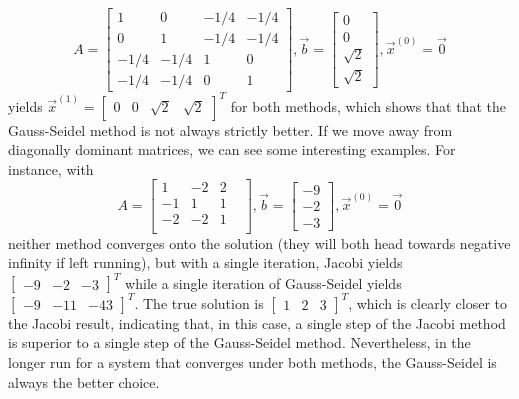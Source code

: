 \documentclass[12pt,letterpaper]{article}
\theoremstyle{definition}
\begin{document}
\begin{equation*}
    A=\begin{bmatrix}
    1&0&-1/4&-1/4\\
    0&1&-1/4&-1/4\\
    -1/4&-1/4&1&0\\
    -1/4&-1/4&0&1
    \end{bmatrix}, \vec{b}=\begin{bmatrix}
    0\\0\\\sqrt{2}\\\sqrt{2}
    \end{bmatrix}, \vec{x}^{(0)}=\vec{0}
\end{equation*}
yields $\vec{x}^{(1)}=\begin{bmatrix}
0&0&\sqrt{2}&\sqrt{2}
\end{bmatrix}^T$ for both methods, which shows that that the Gauss-Seidel method is not always strictly better. If we move away from diagonally dominant matrices, we can see some interesting examples. For instance, with
\begin{equation*}
    A=\begin{bmatrix}
    1&-2&2&\\
    -1&1&1\\
    -2&-2&1\\
    \end{bmatrix}, \vec{b}=\begin{bmatrix}
    -9\\-2\\-3
    \end{bmatrix}, \vec{x}^{(0)}=\vec{0}
\end{equation*}
neither method converges onto the solution (they will both head towards negative infinity if left running), but with a single iteration, Jacobi yields $\begin{bmatrix}
-9&-2&-3
\end{bmatrix}^T$ while a single iteration of Gauss-Seidel yields $\begin{bmatrix}
-9&-11&-43
\end{bmatrix}^T$. The true solution is $\begin{bmatrix}
1&2&3
\end{bmatrix}^T$, which is clearly closer to the Jacobi result, indicating that, in this case, a single step of the Jacobi method is superior to a single step of the Gauss-Seidel method. Nevertheless, in the longer run for a system that converges under both methods, the Gauss-Seidel is always the better choice.
\end{document}

